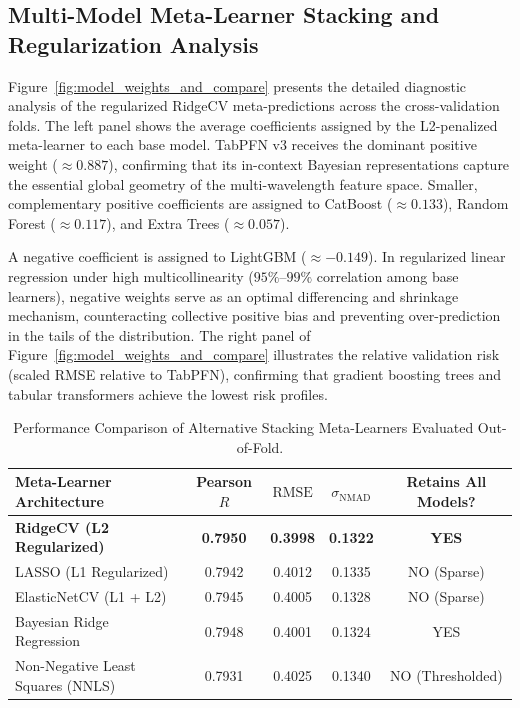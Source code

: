 \documentclass[twocolumn,linenumbers,floatfix]{aastex701}
\begin{document}
\subsection{Multi-Model Meta-Learner Stacking and Regularization Analysis}
\label{subsec:stacking_analysis}

Figure~\ref{fig:model_weights_and_compare} presents the detailed diagnostic analysis of the regularized RidgeCV meta-predictions across the cross-validation folds. The left panel shows the average coefficients assigned by the L2-penalized meta-learner to each base model. TabPFN v3 receives the dominant positive weight ($\approx 0.887$), confirming that its in-context Bayesian representations capture the essential global geometry of the multi-wavelength feature space. Smaller, complementary positive coefficients are assigned to CatBoost ($\approx 0.133$), Random Forest ($\approx 0.117$), and Extra Trees ($\approx 0.057$).

A negative coefficient is assigned to LightGBM ($\approx -0.149$). In regularized linear regression under high multicollinearity ($95\%$--$99\%$ correlation among base learners), negative weights serve as an optimal differencing and shrinkage mechanism, counteracting collective positive bias and preventing over-prediction in the tails of the distribution. The right panel of Figure~\ref{fig:model_weights_and_compare} illustrates the relative validation risk (scaled RMSE relative to TabPFN), confirming that gradient boosting trees and tabular transformers achieve the lowest risk profiles.

\begin{table}[t!]
\centering
\caption{Performance Comparison of Alternative Stacking Meta-Learners Evaluated Out-of-Fold.}
\label{tab:stacking_comparison}
\renewcommand{\arraystretch}{1.15}
\setlength{\tabcolsep}{16pt}
\small
\begin{tabular}{lcccc}
\hline\hline
Meta-Learner Architecture & Pearson $R$ & $\mathrm{RMSE}$ & $\sigma_{\mathrm{NMAD}}$ & Retains All Models? \\
\hline
\textbf{RidgeCV (L2 Regularized)} & \textbf{0.7950} & \textbf{0.3998} & \textbf{0.1322} & \textbf{YES} \\
LASSO (L1 Regularized) & 0.7942 & 0.4012 & 0.1335 & NO (Sparse) \\
ElasticNetCV (L1 + L2) & 0.7945 & 0.4005 & 0.1328 & NO (Sparse) \\
Bayesian Ridge Regression & 0.7948 & 0.4001 & 0.1324 & YES \\
Non-Negative Least Squares (NNLS) & 0.7931 & 0.4025 & 0.1340 & NO (Thresholded) \\
\hline
\end{tabular}
\end{table}
\end{document}
